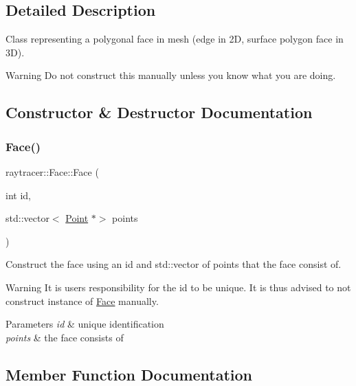 \subsection{Detailed Description}
Class representing a polygonal face in mesh (edge in 2D, surface polygon face in 3D). 

\begin{DoxyWarning}{Warning}
Do not construct this manually unless you know what you are doing. 
\end{DoxyWarning}


\subsection{Constructor \& Destructor Documentation}
\mbox{\label{classraytracer_1_1Face_ad1d772053e4782fe0291df924d3beffe}} 
\subsubsection{\texorpdfstring{Face()}{Face()}}
{\footnotesize\ttfamily raytracer\+::\+Face\+::\+Face (\begin{DoxyParamCaption}\item[{int}]{id,  }\item[{std\+::vector$<$ \hyperlink{classraytracer_1_1Point}{Point} $\ast$$>$}]{points }\end{DoxyParamCaption})\hspace{0.3cm}{\ttfamily [explicit]}}



Construct the face using an id and std\+::vector of points that the face consist of. 

\begin{DoxyWarning}{Warning}
It is users responsibility for the id to be unique. It is thus advised to not construct instance of \hyperlink{classraytracer_1_1Face}{Face} manually.
\end{DoxyWarning}

\begin{DoxyParams}{Parameters}
{\em id} & unique identification \\
\hline
{\em points} & the face consists of \\
\hline
\end{DoxyParams}


\subsection{Member Function Documentation}
\mbox{\label{classraytracer_1_1Face_a1693a7b1269bea1cb1e9ce72f1d10c04}} 
